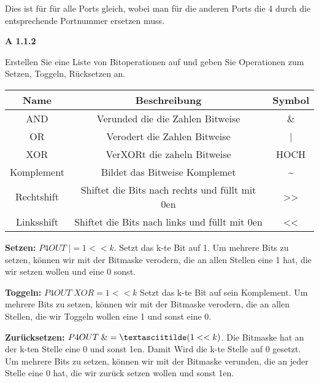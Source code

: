 \documentclass[a4paper,ngerman]{article}
\begin{document}
\begin{description}
Dies ist für für alle Ports gleich, wobei man für die anderen Ports die 4 durch die entsprechende Portnummer ersetzen muss.

\item{\bfseries A 1.1.2}

Erstellen Sie eine Liste von Bitoperationen auf und geben Sie Operationen zum Setzen, Toggeln, Rücksetzen an.

\begin{tabular}{c|c|c}

Name & Beschreibung & Symbol\\
\hline

AND & Verunded die die Zahlen Bitweise &  \&\\

OR & Verodert die Zahlen Bitweise & | \\

XOR &  VerXORt die zaheln Bitweise & HOCH \\

Komplement &  Bildet das Bitweise Komplemet & \textasciitilde \\

Rechtshift & Shiftet die Bits nach rechts und füllt mit 0en & >>\\

Linksshift & Shiftet die Bits nach links und füllt mit 0en & <<\\

\end{tabular}

\begin{description}

\item{\bfseries Setzen:} $P4OUT \; |= 1<< k$. Setzt das k-te Bit auf 1. Um mehrere Bits zu setzen, können wir mit der Bitmaske verodern, die an allen Stellen eine 1 hat, die wir setzen wollen und eine 0 sonst.

\item{\bfseries Toggeln:} $P4OUT \;  XOR= 1<<k$ Setzt das k-te Bit auf sein Komplement. Um mehrere Bits zu setzen, können wir mit der Bitmaske verodern, die an allen Stellen, die wir Toggeln wollen eine 1 und sonst eine 0.

\item{\bfseries Zurücksetzen:} $P4OUT \; \&= \textasciitilde (1<<k)$. Die Bitmaske hat an der k-ten Stelle eine 0 und sonst 1en. Damit Wird die k-te Stelle auf 0 gesetzt. Um mehrere Bits zu setzen, können wir mit der Bitmaske verunden, die an jeder Stelle eine 0 hat, die wir zurück setzen wollen und sonst 1en.


\end{description}
\end{description}
\end{document}
